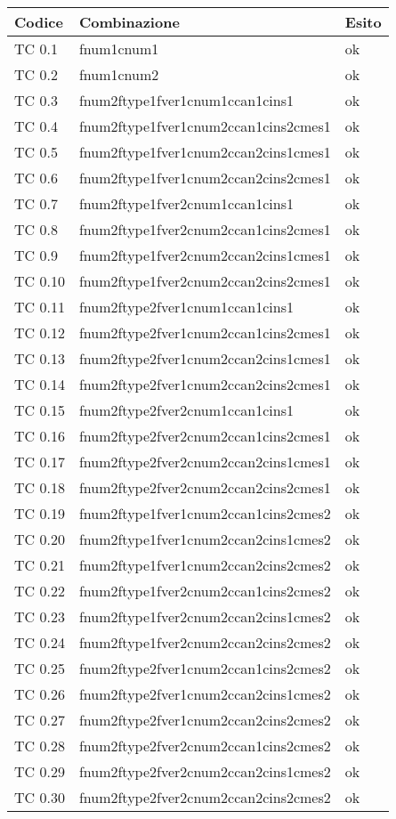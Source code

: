 	\begin{tabular}{|p{3cm}|p{7cm}|p{3cm}|}
		\hline
		\rowcolor{Gray}
		\textbf{Codice} & \textbf{Combinazione} & \textbf{Esito}\tabularnewline
\hline
TC 0.1			& fnum1cnum1					& ok \tabularnewline
\hline
TC 0.2			& fnum1cnum2					& ok \tabularnewline
\hline
TC 0.3			& fnum2ftype1fver1cnum1ccan1cins1		& ok \tabularnewline
\hline
TC 0.4			& fnum2ftype1fver1cnum2ccan1cins2cmes1		& ok \tabularnewline
\hline
TC 0.5			& fnum2ftype1fver1cnum2ccan2cins1cmes1		& ok \tabularnewline
\hline
TC 0.6			& fnum2ftype1fver1cnum2ccan2cins2cmes1		& ok \tabularnewline
\hline
TC 0.7			& fnum2ftype1fver2cnum1ccan1cins1		& ok \tabularnewline
\hline
TC 0.8			& fnum2ftype1fver2cnum2ccan1cins2cmes1		& ok \tabularnewline
\hline
TC 0.9			& fnum2ftype1fver2cnum2ccan2cins1cmes1		& ok \tabularnewline
\hline
TC 0.10			& fnum2ftype1fver2cnum2ccan2cins2cmes1		& ok \tabularnewline
\hline
TC 0.11			& fnum2ftype2fver1cnum1ccan1cins1		& ok \tabularnewline
\hline
TC 0.12			& fnum2ftype2fver1cnum2ccan1cins2cmes1		& ok \tabularnewline
\hline
TC 0.13			& fnum2ftype2fver1cnum2ccan2cins1cmes1		& ok \tabularnewline
\hline
TC 0.14			& fnum2ftype2fver1cnum2ccan2cins2cmes1		& ok \tabularnewline
\hline
TC 0.15			& fnum2ftype2fver2cnum1ccan1cins1		& ok \tabularnewline
\hline
TC 0.16			& fnum2ftype2fver2cnum2ccan1cins2cmes1		& ok \tabularnewline
\hline
TC 0.17			& fnum2ftype2fver2cnum2ccan2cins1cmes1		& ok \tabularnewline
\hline
TC 0.18			& fnum2ftype2fver2cnum2ccan2cins2cmes1		& ok \tabularnewline
\hline
TC 0.19			& fnum2ftype1fver1cnum2ccan1cins2cmes2		& ok \tabularnewline
\hline
TC 0.20			& fnum2ftype1fver1cnum2ccan2cins1cmes2		& ok \tabularnewline
\hline
TC 0.21			& fnum2ftype1fver1cnum2ccan2cins2cmes2		& ok \tabularnewline
\hline
TC 0.22			& fnum2ftype1fver2cnum2ccan1cins2cmes2		& ok \tabularnewline
\hline
TC 0.23			& fnum2ftype1fver2cnum2ccan2cins1cmes2		& ok \tabularnewline
\hline
TC 0.24			& fnum2ftype1fver2cnum2ccan2cins2cmes2		& ok \tabularnewline
\hline
TC 0.25			& fnum2ftype2fver1cnum2ccan1cins2cmes2		& ok \tabularnewline
\hline
TC 0.26			& fnum2ftype2fver1cnum2ccan2cins1cmes2		& ok \tabularnewline
\hline
TC 0.27			& fnum2ftype2fver1cnum2ccan2cins2cmes2		& ok \tabularnewline
\hline
TC 0.28			& fnum2ftype2fver2cnum2ccan1cins2cmes2		& ok \tabularnewline
\hline
TC 0.29			& fnum2ftype2fver2cnum2ccan2cins1cmes2		& ok \tabularnewline
\hline
TC 0.30			& fnum2ftype2fver2cnum2ccan2cins2cmes2		& ok \tabularnewline
\hline
	\end{tabular}
\clearpage




